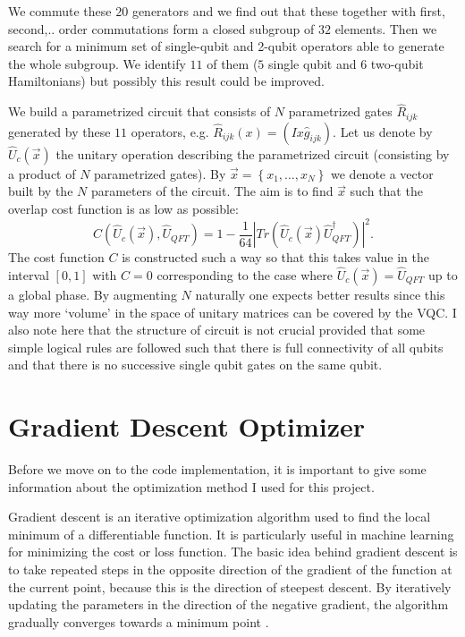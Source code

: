 \documentclass[inscr,ack,preface]{diphdthesis}
\begin{document}
We commute these $20$ generators and we find out that these together with first, second,.. order commutations form
a closed subgroup of $32$ elements. Then we search for a minimum set of single-\acrshort{qubit} and 2-\acrshort{qubit} operators able to generate the whole
subgroup. We identify $11$ of them ($5$ single \acrshort{qubit} and $6$ two-\acrshort{qubit} Hamiltonians) but possibly this result could be improved.

We build a parametrized circuit that consists of $N$ parametrized gates $\hat{R}_{ijk}$ generated  by these $11$ operators, e.g. $\hat{R}_{ijk}\left(x\right)=\left(I x \hat{g}_{ijk}\right)$. Let us denote by $\hat{U}_c\left(\vec{x}\right)$ the unitary operation describing the parametrized circuit (consisting by a product of $N$ parametrized gates). 
By $\vec{x}=\left\{x_1,\ldots, x_{N}\right\}$ we denote a vector built by the $N$ parameters of the circuit. The aim is to find $\vec{x}$ such that the overlap
 cost function is as low as possible:
\begin{equation}
C\left(\hat{U}_c\left(\vec{x}\right), \hat{U}_{QFT}\right)=1-\frac{1}{64}\left|Tr\left(\hat{U}_c\left(\vec{x}\right)\hat{U}_{QFT}^{\dagger} \right)\right|^2. \label{C}
\end{equation}
The cost function $C$ is constructed such a way \cite{paper} so that this takes value in the interval $\left[0,1\right]$
with $C=0$ corresponding to the case where $\hat{U}_c\left(\vec{x}\right)= \hat{U}_{QFT}$ up to a global phase.
By augmenting $N$ naturally one expects better results since this way more `volume' in the space of unitary matrices can be covered by the VQC.  I also note here that the structure of circuit is not crucial provided that some simple logical rules are followed such that  there is full connectivity of all qubits and that there is no successive single qubit gates on the same qubit.



\section{Gradient Descent Optimizer}

Before we move on to the code implementation, it is important to give some information about the optimization method I used for this project. 

Gradient descent is an iterative optimization algorithm used to find the local minimum of a differentiable function. It is particularly useful in machine learning for minimizing the cost or loss function. The basic idea behind gradient descent is to take repeated steps in the opposite direction of the gradient of the function at the current point, because this is the direction of steepest descent. By iteratively updating the parameters in the direction of the negative gradient, the algorithm gradually converges towards a minimum point \cite{gradient}.
\end{document}
